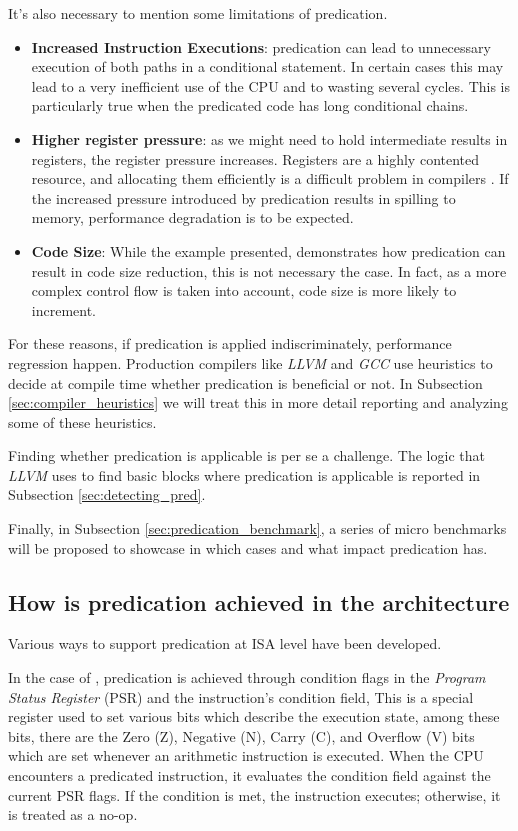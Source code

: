 It's also necessary to mention some limitations of predication.
\begin{itemize}
    \item \textbf{Increased Instruction Executions}: predication can lead to unnecessary execution of both paths in a conditional statement. In certain cases this may lead to a very inefficient use of the CPU and to wasting several cycles. This is particularly true when the predicated code has long conditional chains.
    \item \textbf{Higher register pressure}: as we might need to hold intermediate results in registers, the register pressure increases. Registers are a highly contented resource, and allocating them efficiently is a difficult problem in compilers \cite{chaitin1981register}. If the increased pressure introduced by predication results in spilling to memory, performance degradation is to be expected.
    \item \textbf{Code Size}: While the example presented,  demonstrates how predication can result in code size reduction, this is not necessary the case. In fact, as a more complex control flow is taken into account, code size is more likely to increment.
\end{itemize}

For these reasons, if predication is applied indiscriminately, performance regression happen. Production compilers like \textit{LLVM} and \textit{GCC} use heuristics to decide at compile time whether predication is beneficial or not. In Subsection \ref{sec:compiler_heuristics} we will treat this in more detail reporting and analyzing some of these heuristics.

Finding whether predication is applicable is per se a challenge. The logic that \textit{LLVM} uses to find basic blocks where predication is applicable is reported in Subsection \ref{sec:detecting_pred}.

Finally, in Subsection \ref{sec:predication_benchmark}, a series of micro benchmarks will be proposed to showcase in which cases and what impact predication has.

\subsection{How is predication achieved in the architecture}
\label{sec:arch_support}

Various ways to support predication at ISA level have been developed.

In the case of \armvs, predication is achieved through condition flags in the \textit{Program Status Register} (PSR) and the instruction’s condition field,
This is a special register used to set various bits which describe the execution state, among these bits, there are the Zero (Z), Negative (N), Carry (C), and Overflow (V) bits which are set whenever an arithmetic instruction is executed. 
When the CPU encounters a predicated instruction, it evaluates the condition field against the current PSR flags. If the condition is met, the instruction executes; otherwise, it is treated as a no-op.
 
